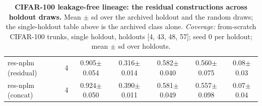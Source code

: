 \begin{table}[t]
\begin{tabular}{lcccccc}
\quad res-nplm (residual) & 4 & 0.905$\pm$0.054 & 0.316$\pm$0.014 & 0.582$\pm$0.040 & 0.560$\pm$0.075 & 0.08$\pm$0.03 \\
\quad res-nplm (concat) & 4 & 0.924$\pm$0.050 & 0.390$\pm$0.011 & 0.581$\pm$0.049 & 0.557$\pm$0.098 & 0.07$\pm$0.04 \\
\bottomrule
\end{tabular}
\caption{\textbf{CIFAR-100 leakage-free lineage: the residual constructions across holdout draws.} Mean $\pm$ sd over the archived holdout and the random draws; the single-holdout table above is the archived class alone. \emph{Coverage:} from-scratch CIFAR-100 trunks, single holdout, holdouts [4, 43, 48, 57]; seed 0 per holdout; mean $\pm$ sd over holdouts.}
\label{tab:app_cifar100_residual_draws}
\end{table}
